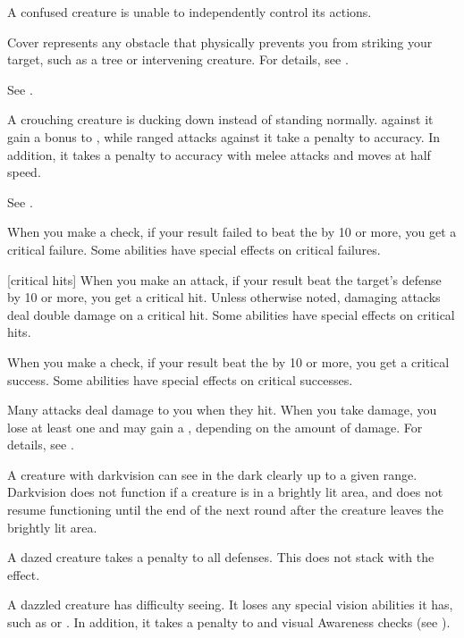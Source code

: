  A confused creature is unable to independently control its actions. \confusionexplanation

 Cover represents any obstacle that physically prevents you from striking your target, such as a tree or intervening creature.
For details, see .

 See .

 A crouching creature is ducking down instead of standing normally.
 against it gain a  bonus to , while  ranged attacks against it take a  penalty to accuracy.
In addition, it takes a  penalty to accuracy with melee attacks and moves at half speed.

 See .

 When you make a check, if your result failed to beat the  by 10 or more, you get a critical failure.
Some abilities have special effects on critical failures.

[critical hits] When you make an attack, if your result beat the target's defense by 10 or more, you get a critical hit.
Unless otherwise noted, damaging attacks deal double damage on a critical hit.
Some abilities have special effects on critical hits.

 When you make a check, if your result beat the  by 10 or more, you get a critical success.
Some abilities have special effects on critical successes.

 Many attacks deal damage to you when they hit.
When you take damage, you lose at least one  and may gain a , depending on the amount of damage.
For details, see .

 A creature with darkvision can see in the dark clearly up to a given range.
Darkvision does not function if a creature is in a brightly lit area, and does not resume functioning until the end of the next round after the creature leaves the brightly lit area.

 A dazed creature takes a  penalty to all defenses.
This does not stack with the  effect.

 A dazzled creature has difficulty seeing.
It loses any special vision abilities it has, such as  or .
In addition, it takes a  penalty to  and visual Awareness checks (see ).

